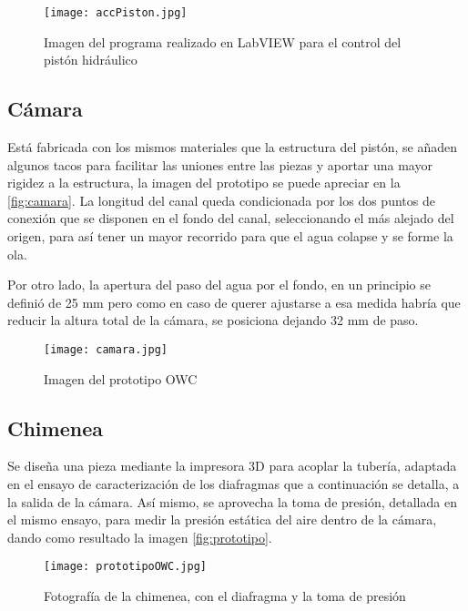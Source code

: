 \begin{figure}[ht]
\centering
\texttt{[image: accPiston.jpg]}
\caption[Accionado de la compuerta]{Imagen del programa realizado en LabVIEW para el control del pistón hidráulico}
\label{fig:accpiston}
\end{figure}

\subsection{Cámara}\label{header-n602}

Está fabricada con los mismos materiales que la estructura del pistón,
se añaden algunos tacos para facilitar las uniones entre las piezas y
aportar una mayor rigidez a la estructura, la imagen del prototipo se puede apreciar en la \autoref{fig:camara}. La longitud del canal queda
condicionada por los dos puntos de conexión que se disponen en el fondo
del canal, seleccionando el más alejado del origen, para así tener un
mayor recorrido para que el agua colapse y se forme la ola.

Por otro lado, la apertura del paso del agua por el fondo, en un
principio se definió de 25 mm pero como en caso de querer ajustarse a
esa medida habría que reducir la altura total de la cámara, se posiciona
dejando 32 mm de paso.

\begin{figure}
\centering
\texttt{[image: camara.jpg]}
\caption{Imagen del prototipo OWC}
\label{fig:camara}
\end{figure}

\subsection{Chimenea}\label{header-n180}

Se diseña una pieza mediante la impresora 3D para acoplar la tubería,
adaptada en el ensayo de caracterización de los diafragmas que a
continuación se detalla, a la salida de la cámara. Así mismo, se
aprovecha la toma de presión, detallada en el mismo ensayo, para medir
la presión estática del aire dentro de la cámara, dando como resultado la imagen \autoref{fig:prototipo}.

\begin{figure}
\centering
\texttt{[image: prototipoOWC.jpg]}
\caption[Chimenea]{Fotografía de la chimenea, con el diafragma y la toma de presión}
\label{fig:prototipo}
\end{figure}

